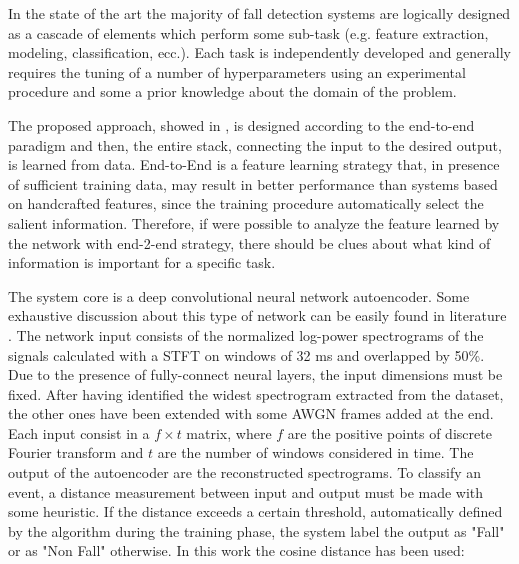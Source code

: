 In the state of the art the majority of fall detection systems are logically designed as a cascade of elements which perform some sub-task (e.g. feature extraction, modeling, classification, ecc.).
Each task is independently developed and generally requires the tuning of a number of hyperparameters using an experimental procedure and some a prior knowledge about the domain of the problem. 

The proposed approach, showed in , is designed according to the end-to-end paradigm and then, the entire stack, connecting the input to the desired output, is learned from data. 
End-to-End is a feature learning strategy that, in presence of sufficient training data, may result in better performance than systems based on handcrafted features, since the training procedure automatically select the salient information.
Therefore, if were possible to analyze the feature learned by the network with end-2-end strategy, there should be clues about what
kind of information is important for a specific task.

The system core is a deep convolutional neural network autoencoder. Some exhaustive discussion about this type of network can be easily  found in literature \cite{ng2011sparse,krizhevsky2012imagenet,marchi2017deep}. 
The network input consists of the normalized log-power spectrograms of the signals calculated with a STFT on windows of 32 ms and overlapped by 50\%.
Due to the presence of fully-connect neural layers, the input dimensions must be fixed. After having identified the widest spectrogram extracted from the dataset, the other ones have been extended with some AWGN frames added at the end. Each input consist in a $f\times t$ matrix, where $f$ are the positive points of discrete Fourier transform and $t$ are the number of windows considered in time.
The output of the autoencoder are the reconstructed spectrograms. To classify an event, a distance measurement between input and output must be made with some heuristic. If the distance exceeds a certain threshold, automatically defined by the algorithm during the training phase, the system label the output as "Fall" or as "Non Fall" otherwise. In this work the cosine distance has been used:


